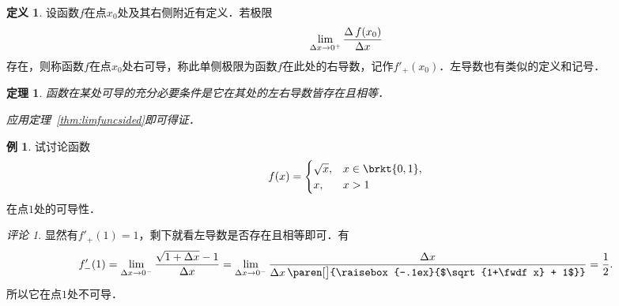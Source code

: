\documentclass[a4paper,punct=CCT]{ctexbook}
\makeatletter
\newtheorem{theorem}{定理}
\theoremstyle{definition}
\newtheorem*{definition*}{定义}
\newtheorem*{example*}{例}
\theoremstyle{remark}
\newtheorem*{remark}{评论}
\renewcommand*{\proofname}{证}
\renewenvironment{proof}[1][\proofname]{\par
  \pushQED{\qed}%
  \normalfont \topsep6\p@\@plus6\p@\relax
  \trivlist
  \item[\hskip\labelsep
    \bfseries
    #1%
    ]\ignorespaces
}{%
  \popQED\endtrivlist\@endpefalse
}
\makeatother
\begin{document}
\begin{definition*}
  设函数\(f\)在点\(x_0\)处及其右侧附近有定义．若极限
  \begin{equation*}
    \lim_{\mathop{}\!\Delta x \to 0^+} \frac{\mathop{}\!\Delta\,f(x_0)}{\mathop{}\!\Delta x}
  \end{equation*}
  存在，则称函数\(f\)在点\(x_0\)处右可导，称此单侧极限为函数\(f\)在此处的右导数，记作\(f'_+(x_0)\)．左导数也有类似的定义和记号．
\end{definition*}

\begin{theorem}
  \label{thm:derivsided}
  函数在某处可导的充分必要条件是它在其处的左右导数皆存在且相等．

  \begin{proof}
    应用定理~\ref{thm:limfuncsided}即可得证．
  \end{proof}
\end{theorem}

\begin{example*}
  试讨论函数
  \begin{equation*}
    f(x) =
    \begin{cases}
      \sqrt x, & x \in \brkt{0,1}, \\
      x, & x > 1
    \end{cases}
  \end{equation*}
  在点\(1\)处的可导性．

  \begin{remark}
    显然有\(f'_+(1) = 1\)，剩下就看左导数是否存在且相等即可．有
    \begin{equation*}
      f'_-(1)
      = \lim_{\fwdf x \to 0^-} \frac{\sqrt{1+\fwdf x} - 1}{\fwdf x}
      = \lim_{\fwdf x \to 0^-} \frac{\fwdf x}{\raisebox{-.1ex}{$\fwdf x$}\,\paren[\big]{\raisebox{-.1ex}{$\sqrt{1+\fwdf x} + 1$}}}
      = \frac12.
    \end{equation*}
    所以它在点\(1\)处不可导．
  \end{remark}
\end{example*}
\end{document}
